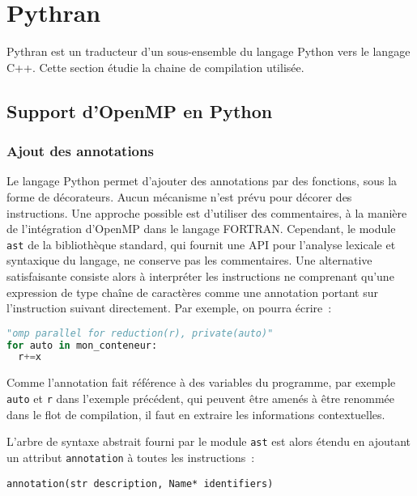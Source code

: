 \documentclass[renpar]{compas2013}
\begin{document}
\section{Pythran}\label{sec:pythran}

Pythran est un traducteur d'un sous-ensemble du langage Python vers le
langage C++. Cette section étudie la chaine de compilation utilisée.

\subsection{Support d'OpenMP en Python}
\label{sec:python-openmp}

\subsubsection{Ajout des annotations}

Le langage Python permet d'ajouter des annotations par des fonctions, sous
la forme de décorateurs. Aucun mécanisme n'est prévu pour décorer des
instructions. Une approche possible est d'utiliser des commentaires, à la
manière de l'intégration d'OpenMP dans le langage FORTRAN. Cependant, le
module \texttt{ast} de la bibliothèque standard, qui fournit une API pour
l'analyse lexicale et syntaxique du langage, ne conserve pas les
commentaires. Une alternative satisfaisante consiste alors à interpréter
les instructions ne comprenant qu'une expression de type chaîne de
caractères comme une annotation portant sur l'instruction suivant
directement. Par exemple, on pourra écrire~:

\begin{lstlisting}[language=python]
"omp parallel for reduction(r), private(auto)"
for auto in mon_conteneur:
  r+=x
\end{lstlisting}

Comme l'annotation fait référence à des variables du programme, par exemple
\texttt{auto} et \texttt{r} dans l'exemple précédent, qui peuvent être amenés à
être renommée dans le flot de compilation, il faut en extraire les informations contextuelles.

L'arbre de syntaxe abstrait fourni par le module \texttt{ast} est alors
étendu en ajoutant un attribut \texttt{annotation} à toutes les
instructions~:

\begin{lstlisting}
annotation(str description, Name* identifiers)
\end{lstlisting}
\end{document}
